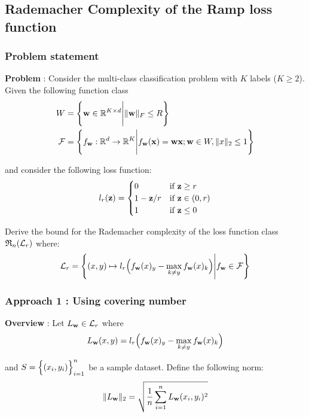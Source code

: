 \newpage
\subsection{Rademacher Complexity of the Ramp loss function}
\label{sec:rad_complexity_of_ramp_loss}

\subsubsection{Problem statement}
\textbf{Problem} : Consider the multi-class classification problem with $K$ labels ($K\ge2$). Given the following function class
\begin{align*}
    W  &= \Bigg\{ 
        {\bf w}\in \mathbb{R}^{K\times d} \Bigg| \|{\bf w}\|_F \le R
     \Bigg\} \\
    \mathcal{F} &= \Bigg\{ 
        f_{{\bf w}}:\mathbb{R}^d \to \mathbb{R}^{K} \Bigg| f_{\bf w}({\bf x}) = {\bf wx}; {\bf w}\in W, \|x\|_2\le 1
     \Bigg\}
\end{align*}

\noindent and consider the following loss function:
\begin{align*}
    l_r({\bf z}) &= \begin{cases}
        0 & \text{if } {\bf z} \ge r \\
        1 - {\bf z}/r &\text{if } {\bf z} \in (0,r) \\ 
        1 &\text{if } {\bf z} \le 0
    \end{cases} \\
\end{align*}

\noindent Derive the bound for the Rademacher complexity of the loss function class $\mathfrak{R}_n(\mathcal{L}_r)$ where:
\begin{align*}
    \mathcal{L}_r = \Bigg\{ 
        (x, y)\mapsto l_r\Big(  f_{\bf w}(x)_y - \max_{k\ne y} f_{\bf w}(x)_k  \Big) \Bigg| f_{{\bf w}} \in \mathcal{F} 
     \Bigg\}
\end{align*}

\subsubsection{Approach 1 : Using covering number}
\noindent\textbf{Overview} : Let $L_{\bf w} \in \mathcal{L}_r$ where
\begin{align*}
    L_{\bf w}(x,y) =  l_r\Big(  f_{\bf w}(x)_y - \max_{k\ne y} f_{\bf w}(x)_k  \Big)
\end{align*}


\noindent and $S=\Big\{ (x_i, y_i) \Big\}_{i=1}^n$ be a sample dataset. Define the following norm:
\begin{align*}
    \|L_{\bf w}\|_2 = \sqrt{
        \frac{1}{n} \sum_{i=1}^n L_{\bf w}(x_i, y_i)^2
    }
\end{align*}

